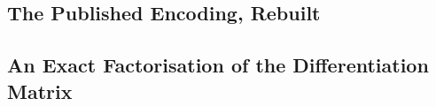 %

\subsection{The Published Encoding, Rebuilt}
\label{sec:standard-published}

\subsection{An Exact Factorisation of the Differentiation Matrix}
\label{sec:standard-factorisation}

